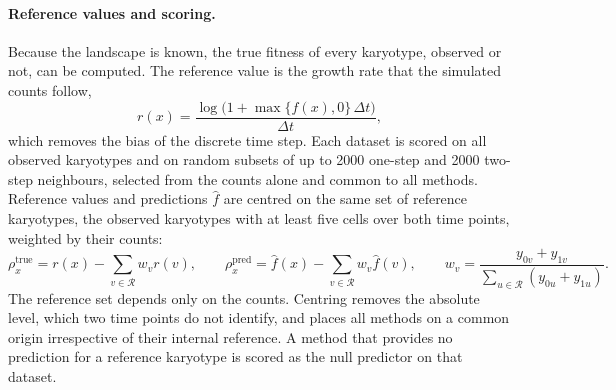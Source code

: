 \documentclass[11pt]{article}
\begin{document}
\paragraph{Reference values and scoring.}
Because the landscape is known, the true fitness of every karyotype, observed
or not, can be computed. The reference value is the growth rate that the
simulated counts follow,
\begin{equation}
  r(x)=\frac{\log\bigl(1+\max\{f(x),0\}\,\Delta t\bigr)}{\Delta t},
  \label{eq:true-rate}
\end{equation}
which removes the bias of the discrete time step. Each dataset is scored on
all observed karyotypes and on random subsets of up to 2000 one-step and 2000
two-step neighbours, selected from the counts alone and common to all
methods. Reference values and predictions $\hat f$ are centred on the same
set of reference karyotypes, the observed karyotypes with at least five cells
over both time points, weighted by their counts:
\begin{equation}
  \rho^{\mathrm{true}}_x=r(x)-\sum_{v\in\mathcal{R}}w_vr(v),\qquad
  \rho^{\mathrm{pred}}_x=\hat f(x)-\sum_{v\in\mathcal{R}}w_v\hat f(v),\qquad
  w_v=\frac{y_{0v}+y_{1v}}{\sum_{u\in\mathcal{R}}(y_{0u}+y_{1u})}.
  \label{eq:scoring-centre}
\end{equation}
The reference set depends only on the counts. Centring removes the absolute
level, which two time points do not identify, and places all methods on a common
origin irrespective of their internal reference. A method that provides no
prediction for a reference karyotype is scored as the null predictor on that
dataset.
\end{document}
